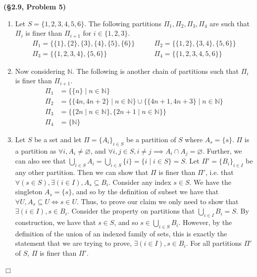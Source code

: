\documentclass[12pt]{article}
\theoremstyle{definition}
\newenvironment{Solution}{\noindent {\sc Solution.}}{$\Box$ \vspace{2 ex}}
\begin{document}
\vspace{0.5cm}

\begin{Solution}
{\bf (\S2.9, Problem 5)}\\
\begin{enumerate}
    \item Let $S=\{1,2,3,4,5,6\}$. The following partitions $\Pi_1,\Pi_2,\Pi_3,\Pi_4$ are such that $\Pi_i$ is finer than $\Pi_{i+1}$ for $i\in\{1,2,3\}$.
    \begin{align*}
        \Pi_1 =\{\{1\},\{2\},\{3\},\{4\},\{5\},\{6\}\} &\qquad \Pi_2 = \{\{1,2\},\{3,4\},\{5,6\}\} \\
        \Pi_3 = \{\{1,2,3,4\},\{5,6\}\} &\qquad \Pi_4=\{\{1,2,3,4,5,6\}\}
    \end{align*}
    \item Now considering $\mathbb N$. The following is another chain of partitions such that $\Pi_i$ is finer than $\Pi_{i+1}$.
    \begin{align*}
        \Pi_1 &= \{\{n\} \mid n \in \mathbb N\} \\
        \Pi_2 &= \{\{4n,4n+2\} \mid n \in \mathbb N\} \cup \{\{4n+1,4n+3\} \mid n\in \mathbb N\} \\
        \Pi_3 &= \{\{2n\mid n\in \mathbb N\},\{2n+1\mid n\in \mathbb N\}\} \\
        \Pi_4 &= \{\mathbb{N}\}
    \end{align*}
    \item Let $S$ be a set and let $\Pi =\{A_i\}_{i\in S}$ be a partition of $S$ where $A_s = \{s\}$. $\Pi$ is a partition as $\forall i,A_i\ne \varnothing$, and $\forall i,j \in S, i\ne j \implies A_i \cap A_j = \varnothing$. Further, we can also see that $\bigcup_{i\in S} A_i=\bigcup_{i\in S}\{i\}=\{i\mid i \in S\}=S$. Let $\Pi'=\{B_i\}_{i\in I}$ be any other partition. Then we can show that $\Pi$ is finer than $\Pi'$, i.e. that $\forall (s\in S),\exists(i\in I),A_s \subseteq B_i$. Consider any index $s\in S$. We have the singleton $A_s =\{s\}$, and so by the definition of subset we have that $\forall U,A_s\subseteq U\iff s\in U$. Thus, to prove our claim we only need to show that $\exists (i\in I), s\in B_i$. Consider the property on partitions that $\bigcup_{i\in I} B_i = S$. By construction, we have that $s \in S$, and so $s \in \bigcup_{i\in S} B_i$. However, by the definition of the union of an indexed family of sets, this is exactly the statement that we are trying to prove, $\exists (i\in I), s\in B_i$. For all partitions $\Pi'$ of $S$, $\Pi$ is finer than $\Pi'$.
\end{enumerate}
\end{Solution}
\end{document}
